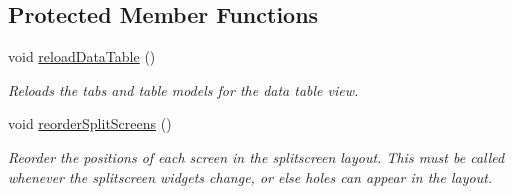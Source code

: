 \subsection*{Protected Member Functions}
\begin{DoxyCompactItemize}
\item 
void \hyperlink{class_lots_of_lines_app_ad855e077f621708e535bec7122e62b17}{reload\+Data\+Table} ()\hypertarget{class_lots_of_lines_app_ad855e077f621708e535bec7122e62b17}{}\label{class_lots_of_lines_app_ad855e077f621708e535bec7122e62b17}

\begin{DoxyCompactList}\small\item\em Reloads the tabs and table models for the data table view. \end{DoxyCompactList}\item 
void \hyperlink{class_lots_of_lines_app_ad918b993305f06ac7dded3b6501e2957}{reorder\+Split\+Screens} ()\hypertarget{class_lots_of_lines_app_ad918b993305f06ac7dded3b6501e2957}{}\label{class_lots_of_lines_app_ad918b993305f06ac7dded3b6501e2957}

\begin{DoxyCompactList}\small\item\em Reorder the positions of each screen in the splitscreen layout. This must be called whenever the splitscreen widgets change, or else holes can appear in the layout. \end{DoxyCompactList}\end{DoxyCompactItemize}
